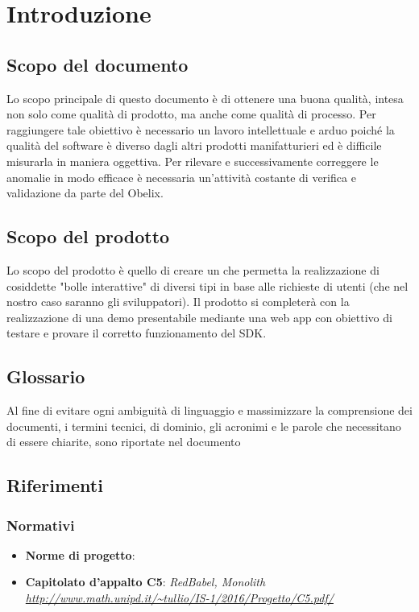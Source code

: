 
\section{Introduzione}
\subsection{Scopo del documento}


Lo scopo principale di questo documento è di ottenere una buona
qualità, intesa non solo come qualità di prodotto, ma anche come
qualità di processo. Per raggiungere tale obiettivo è necessario un
lavoro intellettuale e arduo poiché la qualità del software è diverso
dagli altri prodotti manifatturieri ed è difficile misurarla in
maniera oggettiva. Per rilevare e successivamente correggere le
anomalie in modo efficace è necessaria un'attività costante di
verifica e validazione da parte del  Obelix.


\subsection{Scopo del prodotto}

Lo scopo del prodotto è quello di creare un  che permetta la
realizzazione di cosiddette "bolle interattive" di diversi tipi in
base alle richieste di utenti (che nel nostro caso saranno gli
sviluppatori). Il prodotto si completerà con la realizzazione di una
demo presentabile mediante una web app con obiettivo di testare e
provare il corretto funzionamento del SDK.

\subsection{Glossario}
Al fine di evitare ogni ambiguità di linguaggio e massimizzare la
comprensione dei documenti, i termini tecnici, di dominio, gli
acronimi e le parole che necessitano di essere chiarite, sono
riportate nel documento \gloss

\subsection{Riferimenti}

\subsubsection{Normativi}

\begin{itemize}
\item \textbf{Norme di progetto}:  \normediprogetto
\item \textbf{Capitolato d'appalto C5}: \emph{RedBabel, Monolith \url{http://www.math.unipd.it/~tullio/IS-1/2016/Progetto/C5.pdf/}}

\end{itemize}

